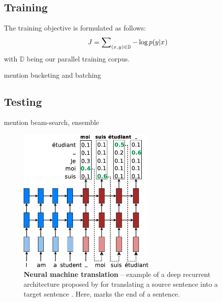\subsection{Training}
The training objective is formulated as follows:
\begin{equation}
J = \sum_{(x_{},y_{}) \in \mathbb{D}} \nolimits -\log p(y_{}|x_{})
\label{e:j_t}
\end{equation}
with $\mathbb{D}$ being our parallel training corpus.

mention bucketing and batching

\subsection{Testing}

mention beam-search, ensemble

\begin{figure}[tbh!]
\centering
\includegraphics[width=0.6\textwidth, clip=true, trim= 0 0 0
0]{img/nmt_test.eps} %
\caption[Neural machine translation]{{\bf Neural machine translation} -- example of a deep recurrent
architecture proposed by  for
translating a source sentence  into a target sentence
. Here, \word{\texttt{\_}} marks the end of a sentence.
} 
\label{f:nmt_details}
\end{figure}


%


